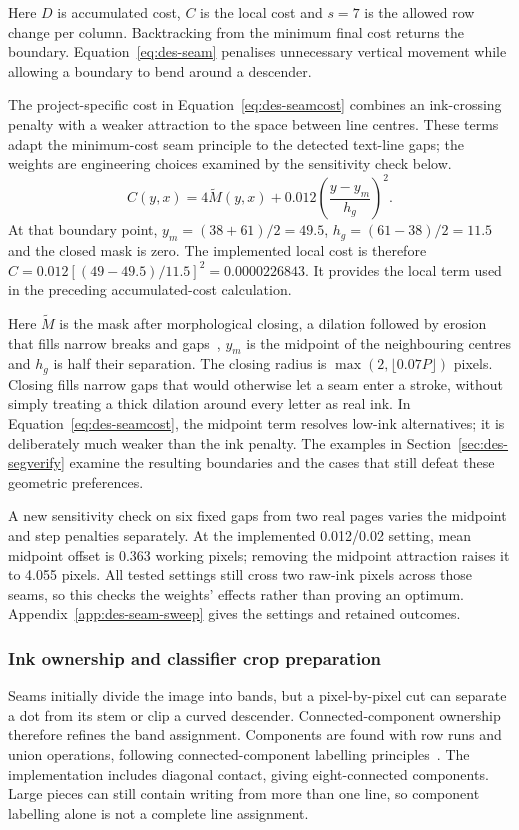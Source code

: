 Here $D$ is accumulated cost, $C$ is the local cost and $s=7$ is the allowed row change per column. Backtracking from the minimum final cost returns the boundary. Equation~\ref{eq:des-seam} penalises unnecessary vertical movement while allowing a boundary to bend around a descender.

The project-specific cost in Equation~\ref{eq:des-seamcost} combines an ink-crossing penalty with a weaker attraction to the space between line centres. These terms adapt the minimum-cost seam principle to the detected text-line gaps; the weights are engineering choices examined by the sensitivity check below.
\begin{equation}
C(y,x)=4\widetilde M(y,x)
+0.012\left(\frac{y-y_m}{h_g}\right)^2.
\label{eq:des-seamcost}
\end{equation}
At that boundary point, $y_m=(38+61)/2=49.5$, $h_g=(61-38)/2=11.5$ and the closed mask is zero. The implemented local cost is therefore $C=0.012[(49-49.5)/11.5]^2=0.0000226843$. It provides the local term used in the preceding accumulated-cost calculation.

Here $\widetilde M$ is the mask after morphological closing, a dilation followed by erosion that fills narrow breaks and gaps~\cite[p.~541, Def.~36]{haralick1987}, $y_m$ is the midpoint of the neighbouring centres and $h_g$ is half their separation. The closing radius is $\max(2,\lfloor0.07P\rfloor)$ pixels. Closing fills narrow gaps that would otherwise let a seam enter a stroke, without simply treating a thick dilation around every letter as real ink. In Equation~\ref{eq:des-seamcost}, the midpoint term resolves low-ink alternatives; it is deliberately much weaker than the ink penalty. The examples in Section~\ref{sec:des-segverify} examine the resulting boundaries and the cases that still defeat these geometric preferences.

A new sensitivity check on six fixed gaps from two real pages varies the midpoint and step penalties separately. At the implemented 0.012/0.02 setting, mean midpoint offset is 0.363 working pixels; removing the midpoint attraction raises it to 4.055 pixels. All tested settings still cross two raw-ink pixels across those seams, so this checks the weights' effects rather than proving an optimum. Appendix~\ref{app:des-seam-sweep} gives the settings and retained outcomes.

\subsubsection{Ink ownership and classifier crop preparation}
Seams initially divide the image into bands, but a pixel-by-pixel cut can separate a dot from its stem or clip a curved descender. Connected-component ownership therefore refines the band assignment. Components are found with row runs and union operations, following connected-component labelling principles~\cite[pp.~476--479]{rosenfeld1966}. The implementation includes diagonal contact, giving eight-connected components. Large pieces can still contain writing from more than one line, so component labelling alone is not a complete line assignment.

